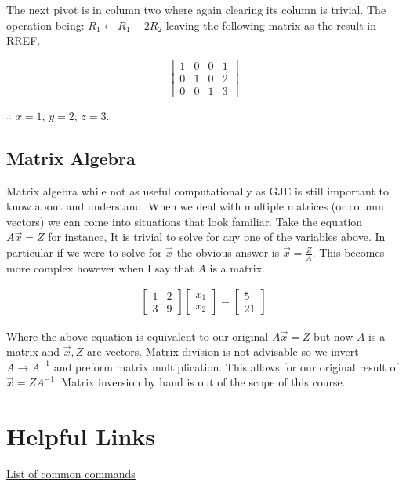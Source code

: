 \documentclass[12pt]{article}
\begin{document}
					The next pivot is in column two where again clearing its column is trivial.
					The operation being: $R_1 \leftarrow R_1 - 2R_2$ leaving the following matrix as the result in RREF.

					\begin{equation}
						\left[
						\begin{array}{ccc|c}
							1  & 0 & 0 & 1 \\
							0  & 1 & 0 & 2 \\
							0  & 0 & 1 & 3
						\end{array}
						\right]
					\end{equation}

					$\therefore$ $x=1$, $y=2$, $z=3$.

				\subsection{Matrix Algebra}
					Matrix algebra while not as useful computationally as GJE is still important to know about and understand.
					When we deal with multiple matrices (or column vectors) we can come into situations that look familiar.
					Take the equation $A\vec{x} = Z$ for instance,
						It is trivial to solve for any one of the variables above.
					In particular if we were to solve for $\vec{x}$ the obvious answer is $\vec{x} = \frac{Z}{A}$.
					This becomes more complex however when I say that $A$ is a matrix.

					\begin{gather}
						\begin{bmatrix}
							1 & 2 \\
							3 & 9
						\end{bmatrix}
						\begin{bmatrix}
							x_1 \\
							x_2
						\end{bmatrix}
						=
						\begin{bmatrix}
							5 \\
							21
						\end{bmatrix}
					\end{gather}

					Where the above equation is equivalent to our original $A\vec{x} = Z$ but now $A$ is a matrix and $\vec{x}, Z$ are vectors.
					Matrix division is not advisable so we invert $A \rightarrow A^{-1}$ and preform matrix multiplication.
					This allows for our original result of $\vec{x} = ZA^{-1}$.
					Matrix inversion by hand is out of the scope of this course.


	\cite{*}

	\newpage %
	\backmatter
	\printbibliography

	\newpage %
	\printindex

	\newpage %
	\appendix
		\section{Helpful Links}
		\href{https://www.mathworks.com/content/dam/mathworks/fact-sheet/matlab-basic-functions-reference.pdf}{List of common commands}
\end{document}
